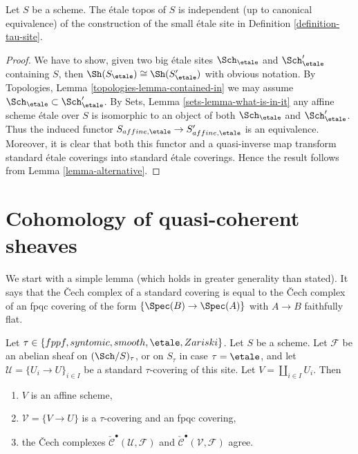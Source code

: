 \begin{lemma}
\label{lemma-etale-topos-independent-partial-universe}
Let $S$ be a scheme. The \'etale topos of $S$ is independent
(up to canonical equivalence) of the construction of the small
\'etale site in Definition \ref{definition-tau-site}.
\end{lemma}

\begin{proof}
We have to show, given two big \'etale sites
$\Sch_\etale$ and $\Sch_\etale'$ containing
$S$, then $\Sh(S_\etale) \cong \Sh(S_\etale')$
with obvious notation. By Topologies, Lemma \ref{topologies-lemma-contained-in}
we may assume $\Sch_\etale \subset \Sch_\etale'$.
By Sets, Lemma \ref{sets-lemma-what-is-in-it}
any affine scheme \'etale over $S$ is isomorphic to an object
of both $\Sch_\etale$ and $\Sch_\etale'$.
Thus the induced functor
$S_{affine, \etale} \to S_{affine, \etale}'$
is an equivalence. Moreover, it is clear that both this functor
and a quasi-inverse map transform standard \'etale coverings into
standard \'etale coverings.
Hence the result follows from Lemma \ref{lemma-alternative}.
\end{proof}





\section{Cohomology of quasi-coherent sheaves}
\label{section-cohomology-quasi-coherent}

\noindent
We start with a simple lemma (which holds in greater generality than
stated). It says that the {\v C}ech complex of a standard covering is
equal to the {\v C}ech complex of an fpqc covering of the form
$\{\Spec(B) \to \Spec(A)\}$ with $A \to B$ faithfully flat.

\begin{lemma}
\label{lemma-cech-complex}
Let $\tau \in \{fppf, syntomic, smooth, \etale, Zariski\}$.
Let $S$ be a scheme.
Let $\mathcal{F}$ be an abelian sheaf on $(\Sch/S)_\tau$, or on
$S_\tau$ in case $\tau = \etale$, and let
$\mathcal{U} = \{U_i \to U\}_{i \in I}$
be a standard $\tau$-covering of this site.
Let $V = \coprod_{i \in I} U_i$. Then
\begin{enumerate}
\item $V$ is an affine scheme,
\item $\mathcal{V} = \{V \to U\}$ is a $\tau$-covering and an fpqc covering,
\item the {\v C}ech complexes
$\check{\mathcal{C}}^\bullet (\mathcal{U}, \mathcal{F})$ and
$\check{\mathcal{C}}^\bullet (\mathcal{V}, \mathcal{F})$ agree.
\end{enumerate}
\end{lemma}

